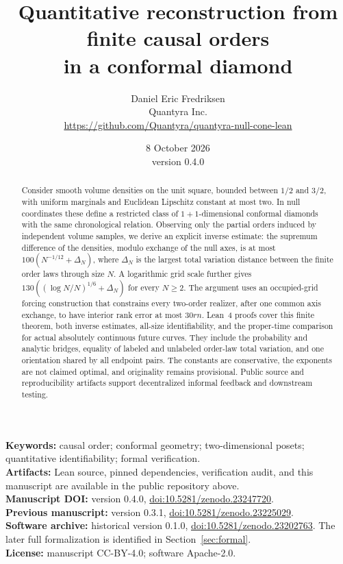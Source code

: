 \documentclass[11pt]{article}
\title{Quantitative reconstruction from finite causal orders\\in a conformal diamond}
\author{Daniel Eric Fredriksen\\Quantyra Inc.\\\url{https://github.com/Quantyra/quantyra-null-cone-lean}}
\date{8 October 2026 \\ version 0.4.0}
\theoremstyle{remark}
\begin{document}
\maketitle
\begin{abstract}
Consider smooth volume densities on the unit square, bounded between
$1/2$ and $3/2$, with uniform marginals and Euclidean Lipschitz constant at
most two. In null coordinates these define a restricted class of
$1+1$-dimensional conformal diamonds with the same chronological relation.
Observing only the partial orders induced by independent volume samples,
we derive an explicit inverse estimate: the supremum difference of the
densities, modulo exchange of the null axes, is at most
$100(N^{-1/12}+\Delta_N)$, where $\Delta_N$ is the largest total variation
distance between the finite order laws through size $N$. A logarithmic
grid scale further gives $130((\log N/N)^{1/6}+\Delta_N)$ for every
$N\ge2$. The argument
uses an occupied-grid forcing construction that constrains every
two-order realizer, after one common axis exchange, to have interior
rank error at most $30rn$. Lean~4 proofs cover this finite theorem,
both inverse estimates, all-size identifiability, and the proper-time
comparison for actual absolutely continuous future curves. They include
the probability and analytic bridges, equality of labeled and unlabeled
order-law total variation, and one orientation shared by all endpoint pairs.
The constants are conservative, the exponents are not claimed optimal,
and originality remains provisional. Public source and reproducibility
artifacts support decentralized informal feedback and downstream testing.
\end{abstract}

\noindent\textbf{Keywords:} causal order; conformal geometry; two-dimensional
posets; quantitative identifiability; formal verification.\\
\textbf{Artifacts:} Lean source, pinned dependencies, verification audit,
and this manuscript are available in the public repository above.\\
\textbf{Manuscript DOI:} version 0.4.0,
\href{https://doi.org/10.5281/zenodo.23247720}{doi:10.5281/zenodo.23247720}.\\
\textbf{Previous manuscript:} version 0.3.1,
\href{https://doi.org/10.5281/zenodo.23225029}{doi:10.5281/zenodo.23225029}.\\
\textbf{Software archive:} historical version 0.1.0,
\href{https://doi.org/10.5281/zenodo.23202763}{doi:10.5281/zenodo.23202763}.
The later full formalization is identified in Section~\ref{sec:formal}.\\
\textbf{License:} manuscript CC-BY-4.0; software Apache-2.0.
\end{document}
